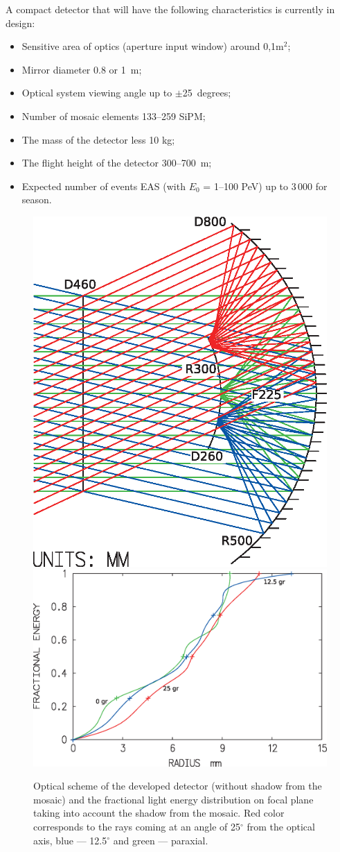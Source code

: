 \documentclass[a4paper,11pt]{article}
\begin{document}
A compact detector that will have the following characteristics is currently in design:

\begin{itemize}
\item Sensitive area of optics (aperture input window) around 0,1m$^2$;
\item Mirror diameter 0.8 or 1~m;
\item Optical system viewing angle up to $\pm$25~degrees;
\item Number of mosaic elements 133--259 SiPM;
\item The mass of the detector less 10 kg;
\item The flight height of the detector 300--700~m;
\item Expected number of events EAS (with $E_0$ = 1--100 PeV) up to 3\,000 for season.
\end{itemize}

\begin{figure}[bt]
\centering %
\includegraphics[width=.32\textwidth,clip]{Sphere3optic.eps}
\qquad
\includegraphics[width=.55\textwidth]{Sphere3spot_energy.eps}
\caption{Optical scheme of the developed detector (without shadow from the mosaic) and the fractional light energy distribution on focal plane taking into account the shadow from the mosaic. Red color corresponds to the rays coming at an angle of 25$^\circ$ from the optical axis, blue --- 12.5$^\circ$ and green --- paraxial.}
\label{fig:optic_sphere3}
\end{figure}
\end{document}
